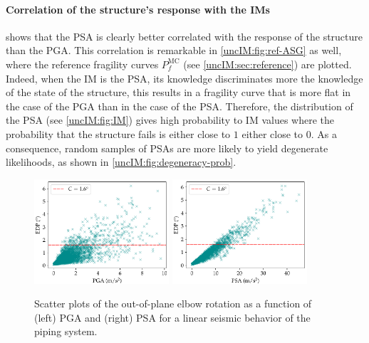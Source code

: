 \paragraph{Correlation of the structure's response with the IMs}
 shows that the PSA is clearly better correlated with the response of the structure than the PGA. 
This correlation is remarkable in \cref{uncIM:fig:ref-ASG} as well, where the reference fragility curves $P_f^{\text{MC}}$ (see \cref{uncIM:sec:reference}) are plotted. Indeed,  when the IM is the PSA, its knowledge discriminates more the knowledge of the state of the structure, this results in a fragility curve that is more flat in the case of the PGA than in the case of the PSA.
Therefore, the distribution of the PSA (see \cref{uncIM:fig:IM}) gives high probability to IM values where the probability that the structure fails is either close to $1$ either close to $0$.
As a consequence, random samples of PSAs are more likely to yield degenerate likelihoods, as shown in \cref{uncIM:fig:degeneracy-prob}.






    \begin{figure}[!ht]
        \centering
         {\includegraphics[width=5cm]{figures/uncIM/cloud_PGA.pdf}}
         {\includegraphics[width=5cm]{figures/uncIM/cloud_PSA.pdf}}
        \caption{Scatter plots of the out-of-plane elbow rotation as a function of (left) PGA and (right) PSA for a linear seismic behavior of the piping system.}
         \label{uncIM:fig:scatterplots_PSA_PGA}
    \end{figure}

